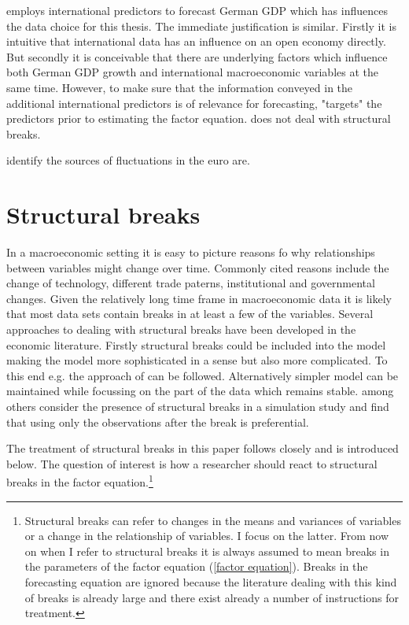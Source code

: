 \documentclass[12pt]{article}
\begin{document}
\citet{schumacher2010factor} employs international predictors to forecast German GDP which has influences the data choice for this thesis. The immediate justification is similar. Firstly it is intuitive that international data has an influence on an open economy directly. But secondly it is conceivable that there are underlying factors which influence both German GDP growth and international macroeconomic variables at the same time. However, to make sure that the information conveyed in the additional international predictors is of relevance for forecasting, \citet{schumacher2010factor} "targets" the predictors prior to estimating the factor equation. \citet{schumacher2010factor} does not deal with structural breaks.


\citet{eickmeier2006synchronized} identify the sources of fluctuations in the euro are. %

\section{Structural breaks}
In a macroeconomic setting it is easy to picture reasons fo why relationships between variables might change over time. Commonly cited reasons include the change of technology, different trade paterns, institutional and governmental changes. Given the relatively long time frame in macroeconomic data it is likely that most data sets contain breaks in at least a few of the variables. Several approaches to dealing with structural breaks have been developed in the economic literature. Firstly structural breaks could be included into the model making the model more sophisticated in a sense but also more complicated. To this end e.g. the approach of \citet{bai2003computation} can be followed. Alternatively simpler model can be maintained while focussing on the part of the data which remains stable. \citet{banerjee2007forecasting} among others consider the presence of structural breaks in a simulation study and find that using only the observations after the break is preferential.

The treatment of structural breaks in this paper follows \citet{breitung2011testing} closely and is introduced below. The question of interest is how a researcher should react to structural breaks in the factor equation.\footnote{Structural breaks can refer to changes in the means and variances of variables or a change in the relationship of variables. I focus on the latter. From now on when I refer to structural breaks it is always assumed to mean breaks in the parameters of the factor equation (\ref{factor equation}). Breaks in the forecasting equation are ignored because the literature dealing with this kind of breaks is already large and there exist already a number of instructions for treatment.}
\end{document}
